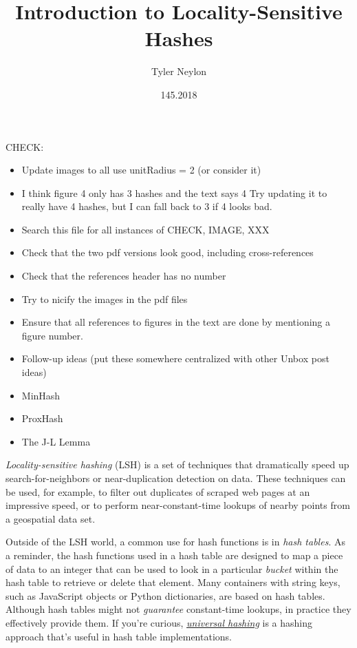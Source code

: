 \documentclass[20pt,]{extarticle}
\title{Introduction to Locality-Sensitive Hashes}
\author{Tyler Neylon}
\date{145.2018}
\providecommand{\tightlist}{%
  \setlength{\itemsep}{0pt}\setlength{\parskip}{0pt}}
\newcommand{\class}[1]{}
\newcommand{\optquad}{\quad}
\newcommand{\smallscrneg}{}
\newcommand{\smallscr}[1]{}
\newcommand{\bigscr}[1]{#1}
\newcommand{\smallscrskip}[1]{}
\begin{document}
\maketitle

CHECK:

\begin{itemize}
\tightlist
\item
  Update images to all use unitRadius = 2 (or consider it)
\item
  I think figure 4 only has 3 hashes and the text says 4 Try updating it
  to really have 4 hashes, but I can fall back to 3 if 4 looks bad.
\item
  Search this file for all instances of CHECK, IMAGE, XXX
\item
  Check that the two pdf versions look good, including cross-references
\item
  Check that the references header has no number
\item
  Try to nicify the images in the pdf files
\item
  Ensure that all references to figures in the text are done by
  mentioning a figure number.
\item
  Follow-up ideas (put these somewhere centralized with other Unbox post
  ideas)
\item
  MinHash
\item
  ProxHash
\item
  The J-L Lemma
\end{itemize}

\newcommand{\R}{\mathbb{R}}
\newcommand{\Z}{\mathbb{Z}}
\newcommand{\eqnset}[1]{\left.\mbox{$#1$}\;\;\right\rbrace\class{postbrace}{ }}
\providecommand{\optquad}{\class{optquad}{}}
\providecommand{\smallscrneg}{\class{smallscrneg}{ }}
\providecommand{\bigscr}[1]{\class{bigscr}{#1}}
\providecommand{\smallscr}[1]{\class{smallscr}{#1}}
\providecommand{\smallscrskip}[1]{\class{smallscrskip}{\hskip #1}}

\emph{Locality-sensitive hashing} (LSH) is a set of techniques that
dramatically speed up search-for-neighbors or near-duplication detection
on data. These techniques can be used, for example, to filter out
duplicates of scraped web pages at an impressive speed, or to perform
near-constant-time lookups of nearby points from a geospatial data set.

Outside of the LSH world, a common use for hash functions is in
\emph{hash tables}. As a reminder, the hash functions used in a hash
table are designed to map a piece of data to an integer that can be used
to look in a particular \emph{bucket} within the hash table to retrieve
or delete that element. Many containers with string keys, such as
JavaScript objects or Python dictionaries, are based on hash tables.
Although hash tables might not \emph{guarantee} constant-time lookups,
in practice they effectively provide them. If you're curious,
\href{https://en.wikipedia.org/wiki/Universal_hashing}{\emph{universal
hashing}} is a hashing approach that's useful in hash table
implementations.
\end{document}
